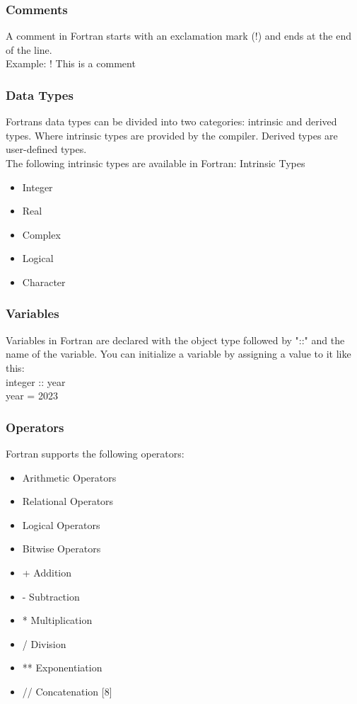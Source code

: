\documentclass[12pt,a4paper]{scrartcl}
\begin{document}
\subsubsection{Comments}
A comment in Fortran starts with an exclamation mark (!) and ends at the end of the line.\\
Example:
! This is a comment\\

\subsubsection{Data Types}
Fortrans data types can be divided into two categories: intrinsic and derived types. Where intrinsic types are provided by the compiler. Derived types are user-defined types.\\
The following intrinsic types are available in Fortran:
Intrinsic Types
\begin{itemize}
\item Integer
\item Real
\item Complex
\item Logical
\item Character
\end{itemize}

\subsubsection{Variables}
Variables in Fortran are declared with the object type followed by "::" and the name of the variable.
You can initialize a variable by assigning a value to it like this:\\
integer :: year\\
year = 2023\\

\subsubsection{Operators}
Fortran supports the following operators:\\
\begin{itemize}
\item Arithmetic Operators
\item Relational Operators
\item Logical Operators
\item Bitwise Operators
\end{itemize}

\begin{itemize}
\item + Addition
\item - Subtraction
\item * Multiplication
\item / Division
\item ** Exponentiation
\item // Concatenation [8]
\end{itemize}
\end{document}
